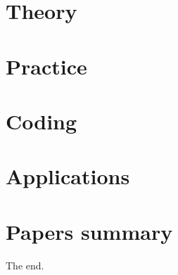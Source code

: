 \documentclass[oneside]{book}
\begin{document}
\part{Theory}\label{prt:theory}

% 



%
%
%



%



%





% 
% 
% 
% 






\part{Practice}\label{prt:practice}
%
%












\part{Coding}\label{prt:coding}









\part{Applications}\label{prt:apps}



\part{Papers summary}\label{prt:papers}

The end.  %


\clearpage
\end{document}
